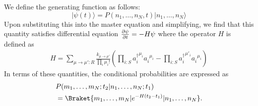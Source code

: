 We define the generating function as follows:
$$
| \psi (t) \rangle =
P (n_1, \ldots, n_N, t) |n_1, \ldots, n_N \rangle
$$
Upon substituting this into the master equation and simplifying, we find
that this quantity satisfies differential equation ${\partial \psi \over
\partial t} = - H \psi$ where the operator $H$ is defined as
\begin{align*}
H = \sum_{\mu \rightarrow \mu' \colon R} \frac{k_{\mu \rightarrow \mu'}}{\prod_i \mu_i !} \left(\prod_{i \colon S} {a_i^{\dagger}}^{\mu_i}{a_i^{}}^{\mu_i} - \prod_{i \colon S} {a_i^{\dagger}}^{\mu'_i}{a_i^{}}^{\mu_i} \right)
\end{align*}
In terms of these quantities, the conditional probabilities are expressed as
\begin{align*}
&P(m_1, \ldots, m_N; t_2 | n_1,\ldots,n_N ; t_1)\\
&= \Braket{m_1, \ldots, m_N| e^{-H(t_2-t_1)}|n_1, \ldots, n_N}.
\end{align*}




